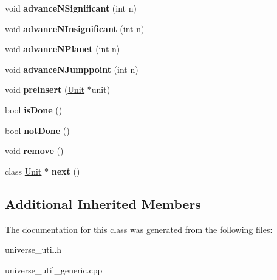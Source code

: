 \begin{DoxyCompactItemize}
\item 
void {\bfseries advance\+N\+Significant} (int n)\hypertarget{classUniverseUtil_1_1PythonUnitIter_a2b218b69cb6399e0e3d7e2794f17e4fd}{}\label{classUniverseUtil_1_1PythonUnitIter_a2b218b69cb6399e0e3d7e2794f17e4fd}

\item 
void {\bfseries advance\+N\+Insignificant} (int n)\hypertarget{classUniverseUtil_1_1PythonUnitIter_a2811d25670e656d9eb9a5edb3b1f5e04}{}\label{classUniverseUtil_1_1PythonUnitIter_a2811d25670e656d9eb9a5edb3b1f5e04}

\item 
void {\bfseries advance\+N\+Planet} (int n)\hypertarget{classUniverseUtil_1_1PythonUnitIter_a980121a30c43ec0a0bfee9145cfda6d0}{}\label{classUniverseUtil_1_1PythonUnitIter_a980121a30c43ec0a0bfee9145cfda6d0}

\item 
void {\bfseries advance\+N\+Jumppoint} (int n)\hypertarget{classUniverseUtil_1_1PythonUnitIter_a0fde6d03c89158cfe326f0da94579605}{}\label{classUniverseUtil_1_1PythonUnitIter_a0fde6d03c89158cfe326f0da94579605}

\item 
void {\bfseries preinsert} (\hyperlink{classUnit}{Unit} $\ast$unit)\hypertarget{classUniverseUtil_1_1PythonUnitIter_a01cce6876ba2b2eac5e42efd4019cef9}{}\label{classUniverseUtil_1_1PythonUnitIter_a01cce6876ba2b2eac5e42efd4019cef9}

\item 
bool {\bfseries is\+Done} ()\hypertarget{classUniverseUtil_1_1PythonUnitIter_aff21fd96c96581243ac869e9a501841a}{}\label{classUniverseUtil_1_1PythonUnitIter_aff21fd96c96581243ac869e9a501841a}

\item 
bool {\bfseries not\+Done} ()\hypertarget{classUniverseUtil_1_1PythonUnitIter_acabbc55fc2eebfc650ae096e5d79de45}{}\label{classUniverseUtil_1_1PythonUnitIter_acabbc55fc2eebfc650ae096e5d79de45}

\item 
void {\bfseries remove} ()\hypertarget{classUniverseUtil_1_1PythonUnitIter_a646a2a6f8b97db9f773317e1c0a3cbc3}{}\label{classUniverseUtil_1_1PythonUnitIter_a646a2a6f8b97db9f773317e1c0a3cbc3}

\item 
class \hyperlink{classUnit}{Unit} $\ast$ {\bfseries next} ()\hypertarget{classUniverseUtil_1_1PythonUnitIter_a0cb2731bbe664a021fccd6706dacd0b5}{}\label{classUniverseUtil_1_1PythonUnitIter_a0cb2731bbe664a021fccd6706dacd0b5}

\end{DoxyCompactItemize}
\subsection*{Additional Inherited Members}


The documentation for this class was generated from the following files\+:\begin{DoxyCompactItemize}
\item 
universe\+\_\+util.\+h\item 
universe\+\_\+util\+\_\+generic.\+cpp\end{DoxyCompactItemize}
